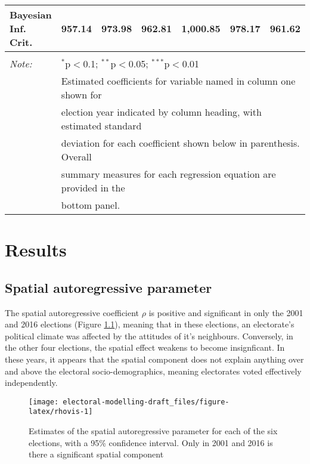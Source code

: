 \documentclass[openany]{book}
\begin{document}
\begin{table}[!htbp]
\begin{tabular}{@{\extracolsep{1pt}}lcccccc}
Bayesian Inf. Crit. & 957.14 & 973.98 & 962.81 & 1,000.85 & 978.17 & 961.62 \\ 
\hline 
\hline \\[-1.8ex] 
\textit{Note:}  & \multicolumn{6}{l}{$^{*}$p$<$0.1; $^{**}$p$<$0.05; $^{***}$p$<$0.01} \\ 
 & \multicolumn{6}{l}{Estimated coefficients for variable named in column one shown for} \\ 
 & \multicolumn{6}{l}{election year indicated by column heading, with estimated standard} \\ 
 & \multicolumn{6}{l}{deviation for each coefficient shown below in parenthesis. Overall} \\ 
 & \multicolumn{6}{l}{summary measures for each regression equation are provided in the} \\ 
 & \multicolumn{6}{l}{bottom panel.} \\ 
\end{tabular} 
\end{table}

\hypertarget{results}{%
\chapter{Results}\label{results}}

\hypertarget{spatial-autoregressive-parameter}{%
\section{Spatial autoregressive parameter}\label{spatial-autoregressive-parameter}}

The spatial autoregressive coefficient \(\rho\) is positive and significant in only the 2001 and 2016 elections (Figure \ref{fig:rhovis}), meaning that in these elections, an electorate's political climate was affected by the attitudes of it's neighbours. Conversely, in the other four elections, the spatial effect weakens to become insignficant. In these years, it appears that the spatial component does not explain anything over and above the electoral socio-demographics, meaning electorates voted effectively independently.

\begin{figure}[h]

{\centering \texttt{[image: electoral-modelling-draft\_files/figure-latex/rhovis-1]} 

}

\caption{Estimates of the spatial autoregressive parameter for each of the six elections, with a 95\% confidence interval. Only in 2001 and 2016 is there a significant spatial component}\label{fig:rhovis}
\end{figure}
\end{document}
